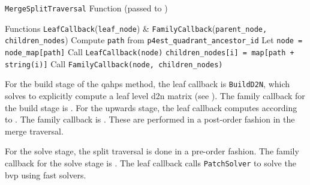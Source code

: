 \begin{algorithm}
\caption{\texttt{MergeSplitTraversal} Function (passed to )}
\begin{algorithmic}[0]
    \Require Functions \texttt{LeafCallback}(\texttt{leaf\_node}) \& \texttt{FamilyCallback}(\texttt{parent\_node, children\_nodes})
    \State Compute \texttt{path} from \texttt{p4est\_quadrant\_ancestor\_id}
    \State Let \texttt{node = node\_map[path]}
     
        \State Call \texttt{LeafCallback(node)}
    \Else {}
            \State \texttt{children\_nodes[i] = map[path + string(i)]}
        \EndFor
        \State Call \texttt{FamilyCallback(node, children\_nodes)}
    \EndIf
\end{algorithmic}
\label{alg:merge-split-callback-serial}
\end{algorithm}

For the build stage of the \gls{qahps} method, the leaf callback is \texttt{BuildD2N}, which solves  to explicitly compute a leaf level \gls{d2n} matrix (see ). The family callback for the build stage is . For the upwards stage, the leaf callback computes \htau according to . The family callback is . These are performed in a post-order fashion in the merge traversal.

For the solve stage, the split traversal is done in a pre-order fashion. The family callback for the solve stage is . The leaf callback calls \texttt{PatchSolver} to solve the \gls{bvp} using fast solvers.